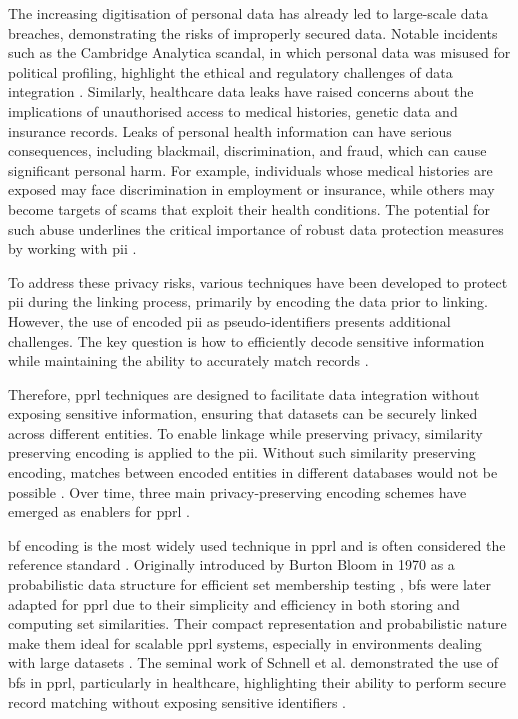 The increasing digitisation of personal data has already led to large-scale data breaches, demonstrating the risks of improperly secured data.
Notable incidents such as the Cambridge Analytica scandal, in which personal data was misused for political profiling, highlight the ethical and regulatory challenges of data integration \cite{isaak2018user}.
Similarly, healthcare data leaks have raised concerns about the implications of unauthorised access to medical histories, genetic data and insurance records.
Leaks of personal health information can have serious consequences, including blackmail, discrimination, and fraud, which can cause significant personal harm.
For example, individuals whose medical histories are exposed may face discrimination in employment or insurance, while others may become targets of scams that exploit their health conditions.
The potential for such abuse underlines the critical importance of robust data protection measures by working with \ac{pii} \cite{smith2016examining}.

To address these privacy risks, various techniques have been developed to protect \ac{pii} during the linking process, primarily by encoding the data prior to linking.
However, the use of encoded \ac{pii} as pseudo-identifiers presents additional challenges.
The key question is how to efficiently decode sensitive information while maintaining the ability to accurately match records \cite{schnell2009privacy}.

Therefore, \ac{pprl} techniques are designed to facilitate data integration without exposing sensitive information, ensuring that datasets can be securely linked across different entities.
To enable linkage while preserving privacy, similarity preserving encoding is applied to the \ac{pii}.
Without such similarity preserving encoding, matches between encoded entities in different databases would not be possible \cite{schnell2009privacy, vatsalan2017privacy}.
Over time, three main privacy-preserving encoding schemes have emerged as enablers for \ac{pprl} \cite{vidanage2020graph, schaefer2024}.

\ac{bf} encoding is the most widely used technique in \ac{pprl} and is often considered the reference standard \cite{schaefer2024}.
Originally introduced by Burton Bloom in 1970 as a probabilistic data structure for efficient set membership testing \cite{bloom1970space}, \ac{bf}s were later adapted for \ac{pprl} due to their simplicity and efficiency in both storing and computing set similarities.
Their compact representation and probabilistic nature make them ideal for scalable \ac{pprl} systems, especially in environments dealing with large datasets \cite{schnell2009privacy}.
The seminal work of Schnell et al. \cite{schnell2009privacy} demonstrated the use of \ac{bf}s in \ac{pprl}, particularly in healthcare, highlighting their ability to perform secure record matching without exposing sensitive identifiers \cite{schnell2009privacy}.

